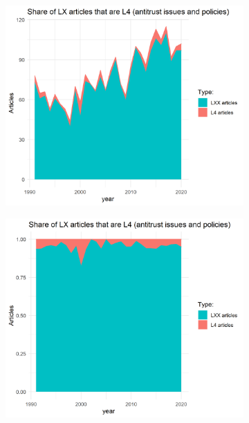 \documentclass[11pt, letterpaper, twoside]{article}
\begin{document}
\begin{figure}
    \begin{subfigure}[h]{0.49\textwidth}
        \centering
        \includegraphics[width=\textwidth]{L4-vs-LXX.png}
    \end{subfigure}
    \hfill
    \begin{subfigure}[h]{0.49\textwidth}
        \centering
        \includegraphics[width=\textwidth]{L4-vs-LXX-normalized.png}
    \end{subfigure}
\end{figure}
\end{document}
